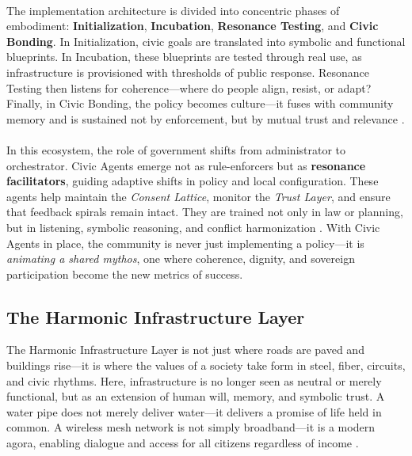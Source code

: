 \documentclass[12pt]{article}
\begin{document}
\paragraph{}The implementation architecture is divided into concentric phases of embodiment: \textbf{Initialization}, \textbf{Incubation}, \textbf{Resonance Testing}, and \textbf{Civic Bonding}. In Initialization, civic goals are translated into symbolic and functional blueprints. In Incubation, these blueprints are tested through real use, as infrastructure is provisioned with thresholds of public response. Resonance Testing then listens for coherence—where do people align, resist, or adapt? Finally, in Civic Bonding, the policy becomes culture—it fuses with community memory and is sustained not by enforcement, but by mutual trust and relevance \cite{taylor2004mdernsocialinstitutions,fraser2003justice}.

\paragraph{}In this ecosystem, the role of government shifts from administrator to orchestrator. Civic Agents emerge not as rule-enforcers but as \textbf{resonance facilitators}, guiding adaptive shifts in policy and local configuration. These agents help maintain the \textit{Consent Lattice}, monitor the \textit{Trust Layer}, and ensure that feedback spirals remain intact. They are trained not only in law or planning, but in listening, symbolic reasoning, and conflict harmonization \cite{levinas1969totality,decmic2022reclaiming}. With Civic Agents in place, the community is never just implementing a policy—it is \textit{animating a shared mythos}, one where coherence, dignity, and sovereign participation become the new metrics of success.

\subsection{The Harmonic Infrastructure Layer}

The Harmonic Infrastructure Layer is not just where roads are paved and buildings rise—it is where the values of a society take form in steel, fiber, circuits, and civic rhythms. Here, infrastructure is no longer seen as neutral or merely functional, but as an extension of human will, memory, and symbolic trust. A water pipe does not merely deliver water—it delivers a promise of life held in common. A wireless mesh network is not simply broadband—it is a modern agora, enabling dialogue and access for all citizens regardless of income \cite{sen1999development,goffman2014ontherun}.
\end{document}
